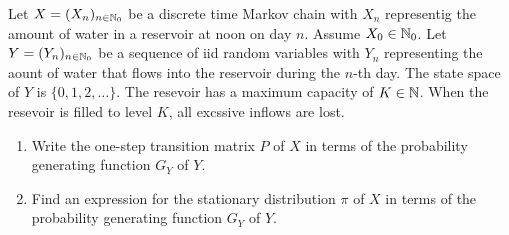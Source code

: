 \begin{problem}
    Let \( X = (X_n)_{n\in\mathbb{N}_0} \) be a discrete time Markov chain with \( X_n \) representig the amount of water in a reservoir at noon on day \( n \). Assume \( X_0 \in \mathbb{N}_0 \). Let \( Y = (Y_n)_{n\in\mathbb{N}_0} \) be a sequence of iid random variables with \( Y_n \) representing the aount of water that flows into the reservoir during the \( n \)-th day. The state space of \( Y \) is \( \{0,1,2,\ldots \} \). The resevoir has a maximum capacity of \( K\in\mathbb{N} \). When the resevoir is filled to level \( K \), all excssive inflows are lost.
    \begin{enumerate}[nolistsep,label=(\alph*)]
        \item Write the one-step transition matrix \( P \) of \( X \) in terms of the probability generating function \( G_Y \) of \( Y \).
        \item Find an expression for the stationary distribution \( \pi \) of \( X \) in terms of the probability generating function \( G_Y \) of \( Y \).
    \end{enumerate}
\end{problem}

